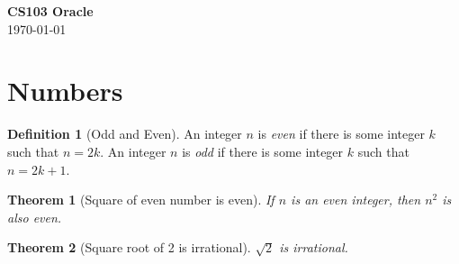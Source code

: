 \documentclass[12pt]{article}
\newtheorem{theorem}{Theorem}[section]
\theoremstyle{definition}
\newtheorem{definition}{Definition}[section]
\begin{document}
\begin{center}
    {\Huge \bf \color{titlecolor} CS103 Oracle} \\ \vspace{1em}
    {\today}
\end{center}

\tableofcontents

\section{Numbers}
\begin{definition}[Odd and Even]
    An integer $n$ is \emph{even} if there is some integer $k$ such that $n = 2k$. An integer $n$ is \emph{odd} if there is some integer $k$ such that $n = 2k+1$.
\end{definition}
\begin{theorem}[Square of even number is even]
    If $n$ is an even integer, then $n^2$ is also even.
\end{theorem}
\begin{theorem}[Square root of 2 is irrational]
    $\sqrt{2}$ is irrational.
\end{theorem}
\end{document}
